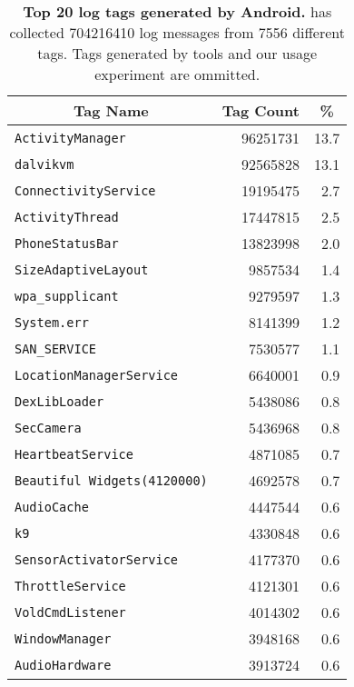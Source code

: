 \begin{table}[t]
\begin{threeparttable}
{\small
\begin{tabularx}{\columnwidth}{Xrr}
\multicolumn{1}{c}{\normalsize{\textbf{Tag Name}}} & 
\multicolumn{1}{c}{\normalsize{\textbf{Tag Count}}} & 
\multicolumn{1}{c}{\normalsize{\textbf{\%}}} \\
\toprule
\texttt{ActivityManager} & \num{96251731} & 13.7 \\
\texttt{dalvikvm} & \num{92565828} & 13.1 \\
\texttt{ConnectivityService} & \num{19195475} & 2.7 \\
\texttt{ActivityThread} & \num{17447815} & 2.5 \\
\texttt{PhoneStatusBar} & \num{13823998} & 2.0 \\
\texttt{SizeAdaptiveLayout} & \num{9857534} & 1.4 \\
\texttt{wpa\_supplicant} & \num{9279597} & 1.3 \\
\texttt{System.err} & \num{8141399} & 1.2 \\
\texttt{SAN\_SERVICE} & \num{7530577} & 1.1 \\
\texttt{LocationManagerService} & \num{6640001} & 0.9 \\
\texttt{DexLibLoader} & \num{5438086} & 0.8 \\
\texttt{SecCamera} & \num{5436968} & 0.8 \\
\texttt{HeartbeatService} & \num{4871085} & 0.7 \\
\texttt{Beautiful Widgets(4120000)} & \num{4692578} & 0.7 \\
\texttt{AudioCache} & \num{4447544} & 0.6 \\
\texttt{k9} & \num{4330848} & 0.6 \\
\texttt{SensorActivatorService} & \num{4177370} & 0.6 \\
\texttt{ThrottleService} & \num{4121301} & 0.6 \\
\texttt{VoldCmdListener} & \num{4014302} & 0.6 \\
\texttt{WindowManager} & \num{3948168} & 0.6 \\
\texttt{AudioHardware} & \num{3913724} & 0.6 \\
\end{tabularx}
}
\caption{\textbf{Top 20 log tags generated by Android.} \PhoneLab{} has
collected \num{704216410} log messages from \num{7556} different tags. Tags generated
by \PhoneLab{} tools and our usage experiment are ommitted.}
\label{table-logtags}
\end{threeparttable}
\end{table}
